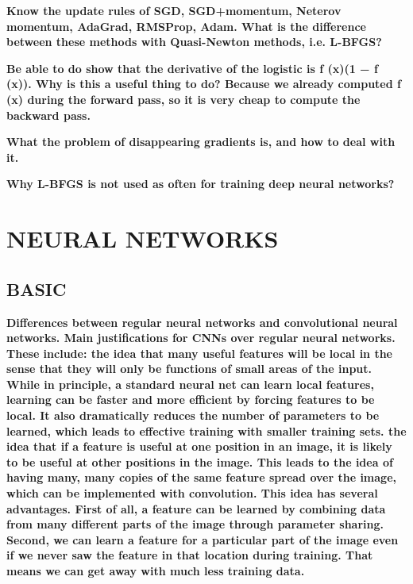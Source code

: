 \documentclass[10pt,letterpaper]{article}
\begin{document}
\subitem \textbf{ Know the update rules of SGD, SGD+momentum, Neterov momentum, AdaGrad, RMSProp, Adam. What is the difference between these methods with Quasi-Newton methods, i.e. L-BFGS?}
\begin{solution}
\end{solution}

\subitem \textbf{ Be able to do show that the derivative of the logistic is f (x)(1 − f (x)). Why is this a useful thing to do? Because we already computed f (x) during the forward pass, so it is very cheap to compute the backward pass.}
\begin{solution}
\end{solution}

\subitem \textbf{ What the problem of disappearing gradients is, and how to deal with it.}
\begin{solution}
\end{solution}

\subitem \textbf{ Why L-BFGS is not used as often for training deep neural networks?}
\begin{solution}
\end{solution}

\section{NEURAL NETWORKS}
\subsection{BASIC}
\subitem \textbf{ Differences between regular neural networks and convolutional neural networks. Main justifications for CNNs over regular neural networks.  These include:
\subsubitem the idea that many useful features will be local in the sense that they will only be functions of small areas of the input. While in principle, a standard neural net can learn local features, learning can be faster and more efficient by forcing features to be local. It also dramatically reduces the number of parameters to be learned, which leads to effective training with smaller training sets.
\subsubitem the idea that if a feature is useful at one position in an image, it is likely to be useful at other positions in the image. This leads to the idea of having many, many copies of the same feature spread over the image, which can be implemented with convolution. This idea has several advantages. First of all, a feature can be learned by combining data from many different parts of the image through parameter sharing. Second, we can learn a feature for a particular part of the image even if we never saw the feature in that location during training. That means we can get away with much less training data.}
\begin{solution}
\end{solution}
\end{document}
